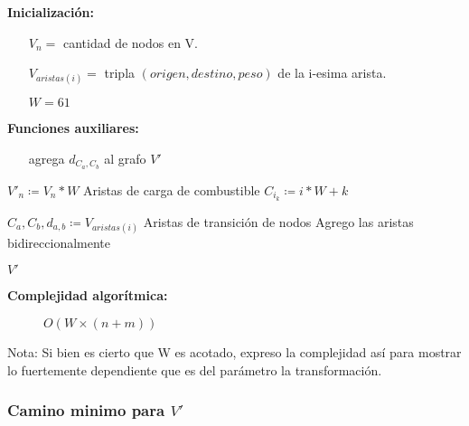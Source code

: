 \documentclass[12pt]{article}
\def\is{\coloneqq}
\begin{document}
\begin{algorithm}[H]
	\caption{$f(V)$}
	\begin{algorithmic}[1]
		\item[\textbf{Inicialización:}]
		\item[] \begin{itemize}
			\item[] $V_n = $ cantidad de nodos en V.
			\item[] $V_{aristas(i)} = $ tripla $(origen, destino, peso)$ de la i-esima arista.
			\item[] $W = 61$
		\end{itemize}
		\item[\textbf{Funciones auxiliares:}]
		\item[] \begin{itemize}
			\item[]  agrega $d_{C_a,C_b}$ al grafo $V'$
		\end{itemize}
		\Statex
		\State $V'_n \is V_n * W$
		\Comment Aristas de carga de combustible
		\State $C_{i_k} \is i * W + k$
		\State {}
		\EndFor
		\EndFor
		\State
		
		\State $C_a,C_b,d_{a,b} \is V_{aristas(i)}$
		\Comment Aristas de transición de nodos
		\Comment Agrego las aristas bidireccionalmente
		\State {}
		\State {}
		\EndIf
		\EndFor
		\EndFor
		
		\State \Return $V'$
		\EndFunction
	\end{algorithmic}
	\begin{description}
		\item[\textbf{Complejidad algorítmica:}] $O(W \times (n + m))$
	\end{description}
\end{algorithm}

Nota: Si bien es cierto que W es acotado, expreso la complejidad así para mostrar lo fuertemente dependiente que es del parámetro la transformación.

\subsubsection{Camino minimo para $V'$}
\end{document}
